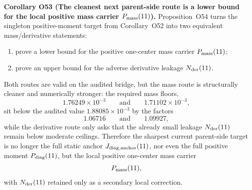 \documentclass[aps,prd,onecolumn,notitlepage,nofootinbib,superscriptaddress,11pt,floatfix]{revtex4-2}
\begin{document}
\medskip\noindent\textbf{Corollary O53 (The cleanest next parent-side route is a lower bound for the local positive mass carrier \(P_{\rm mass}(11)\)).}
Proposition~O54 turns the singleton positive-moment target from Corollary~O52 into two equivalent mass/derivative statements:
\begin{enumerate}
\item prove a lower bound for the positive one-center mass carrier \(P_{\rm mass}(11)\);
\item prove an upper bound for the adverse derivative leakage \(N_{\rm der}(11)\).
\end{enumerate}
Both routes are valid on the audited bridge, but the mass route is structurally cleaner and numerically stronger: the required mass floors,
\[
1.76249\times10^{-3}
\qquad\text{and}\qquad
1.71102\times10^{-3},
\]
sit below the audited value \(1.88085\times10^{-3}\) by the factors
\[
1.06716
\qquad\text{and}\qquad
1.09927,
\]
while the derivative route only asks that the already small leakage \(N_{\rm der}(11)\) remain below moderate ceilings.  Therefore the sharpest current parent-side target is no longer the full static anchor \(J_{\rm diag,anchor}(11)\), nor even the full positive moment \(P_{\rm diag}(11)\), but the local positive one-center mass carrier
\[
P_{\rm mass}(11),
\]
with \(N_{\rm der}(11)\) retained only as a secondary local correction.
\end{document}
